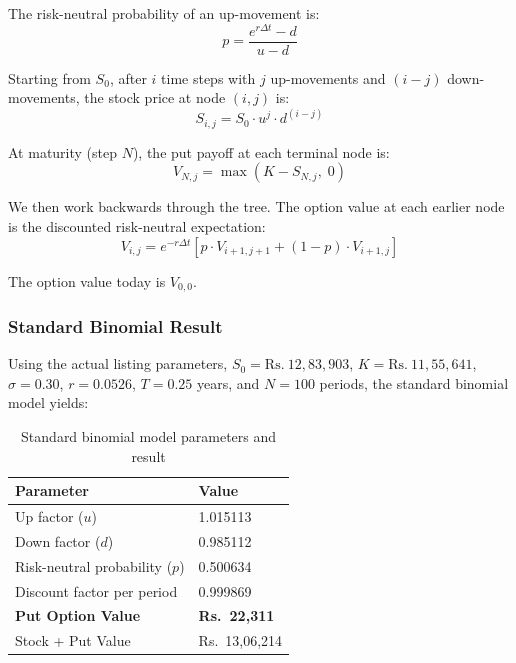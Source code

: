 \documentclass[11pt, a4paper]{article}
\begin{document}
The risk-neutral probability of an up-movement is:
\begin{equation}
    p = \frac{e^{r \Delta t} - d}{u - d}
\end{equation}

Starting from $S_0$, after $i$ time steps with $j$ up-movements and $(i-j)$ down-movements, the stock price at node $(i,j)$ is:
\begin{equation}
    S_{i,j} = S_0 \cdot u^j \cdot d^{(i-j)}
\end{equation}

At maturity (step $N$), the put payoff at each terminal node is:
\begin{equation}
    V_{N,j} = \max(K - S_{N,j}, \; 0)
\end{equation}

We then work backwards through the tree. The option value at each earlier node is the discounted risk-neutral expectation:
\begin{equation}
    V_{i,j} = e^{-r \Delta t} \left[ p \cdot V_{i+1, j+1} + (1-p) \cdot V_{i+1, j} \right]
\end{equation}

The option value today is $V_{0,0}$.

\subsubsection{Standard Binomial Result}

Using the actual listing parameters, $S_0 = \text{Rs.}~12{,}83{,}903$, $K = \text{Rs.}~11{,}55{,}641$, $\sigma = 0.30$, $r = 0.0526$, $T = 0.25$ years, and $N = 100$ periods, the standard binomial model yields:

\begin{table}[H]
\centering
\caption{Standard binomial model parameters and result}
\begin{tabular}{@{}ll@{}}
\toprule
\textbf{Parameter} & \textbf{Value} \\
\midrule
Up factor ($u$) & 1.015113 \\
Down factor ($d$) & 0.985112 \\
Risk-neutral probability ($p$) & 0.500634 \\
Discount factor per period & 0.999869 \\
\midrule
\textbf{Put Option Value} & \textbf{Rs.~22,311} \\
Stock + Put Value & Rs.~13,06,214 \\
\bottomrule
\end{tabular}
\end{table}
\end{document}
